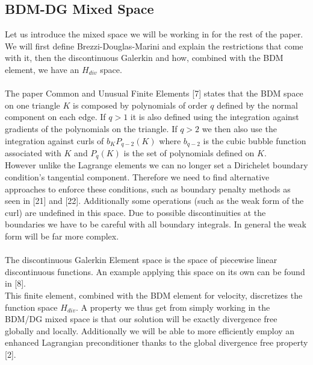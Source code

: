 \documentclass[11pt,twoside,a4paper]{article}
\begin{document}
\subsection{BDM-DG Mixed Space}
Let us introduce the mixed space we will be working in for the rest of the paper. We will first define Brezzi-Douglas-Marini and explain the restrictions that come with it, then the discontinuous Galerkin and how, combined with the BDM element, we have an $H_{div}$ space.\\
\\
The paper Common and Unusual Finite Elements [7] states that the BDM space on one triangle $K$ is composed by polynomials of order $q$ defined by the normal component on each edge. If $q > 1$ it is also defined using the integration against gradients of the polynomials on the triangle. If $q > 2$ we then also use the integration  against curls of $b_K P_{q-2}(K)$ where $b_{q-2}$ is the cubic bubble function associated with $K$ and $P_{q}(K)$ is the set of polynomials defined on $K$.\\

However unlike the Lagrange elements we can no longer set a Dirichelet boundary condition's tangential component. Therefore we need to find alternative approaches to enforce these conditions, such as boundary penalty methods as seen in [21] and [22].
Additionally some operations (such as the weak form of the curl) are undefined in this space. Due to possible discontinuities at the boundaries we have to be careful with all boundary integrals.
In general the weak form will be far more complex.\\
\\

The discontinuous Galerkin Element space is the space of piecewise linear discontinuous functions. An example applying this space on its own can be found in [8].\\
This finite element, combined with the BDM element for velocity, discretizes the function space $H_{div}$. A property we thus get from simply working in the BDM/DG mixed space is that our solution will be exactly divergence free globally and locally.
Additionally we will be able to more efficiently employ an enhanced Lagrangian preconditioner thanks to the global divergence free property [2].\\
\end{document}
